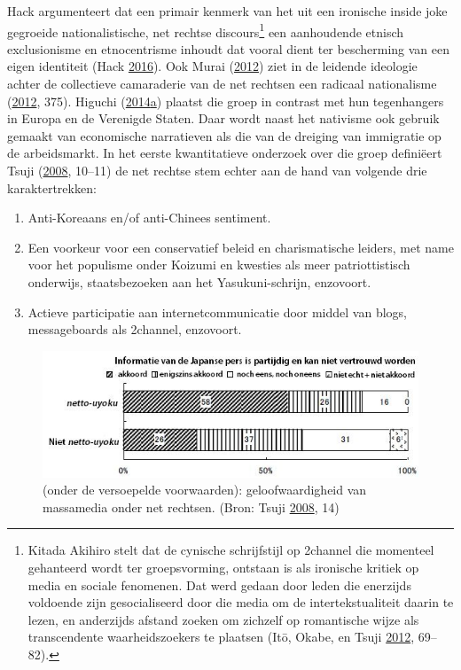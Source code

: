 \documentclass[10.5pt,dutch,]{article}
\providecommand{\tightlist}{%
  \setlength{\itemsep}{0pt}\setlength{\parskip}{0pt}}
\begin{document}
Hack argumenteert dat een primair kenmerk van het uit een ironische
inside joke gegroeide nationalistische, net rechtse discours\footnote{Kitada
  Akihiro stelt dat de cynische schrijfstijl op 2channel die momenteel
  gehanteerd wordt ter groepsvorming, ontstaan is als ironische kritiek
  op media en sociale fenomenen. Dat werd gedaan door leden die
  enerzijds voldoende zijn gesocialiseerd door die media om de
  intertekstualiteit daarin te lezen, en anderzijds afstand zoeken om
  zichzelf op romantische wijze als transcendente waarheidszoekers te
  plaatsen (Itō, Okabe, en Tsuji
  \protect\hyperlink{ref-itoux5ffandomux5f2012}{2012}, 69--82).} een
aanhoudende etnisch exclusionisme en etnocentrisme inhoudt dat vooral
dient ter bescherming van een eigen identiteit (Hack
\protect\hyperlink{ref-hackux5fsubcultureux5f2016}{2016}). Ook Murai
(\protect\hyperlink{ref-muraiux5fnetux5f2012}{2012}) ziet in de leidende
ideologie achter de collectieve camaraderie van de net rechtsen een
radicaal nationalisme
(\protect\hyperlink{ref-muraiux5fnetux5f2012}{2012}, 375). Higuchi
(\protect\hyperlink{ref-higuchiux5fjapansux5f2014}{2014}\protect\hyperlink{ref-higuchiux5fjapansux5f2014}{a})
plaatst die groep in contrast met hun tegenhangers in Europa en de
Verenigde Staten. Daar wordt naast het nativisme ook gebruik gemaakt van
economische narratieven als die van de dreiging van immigratie op de
arbeidsmarkt. In het eerste kwantitatieve onderzoek over die groep
definiëert Tsuji
(\protect\hyperlink{ref-tsujiux5fintanettoux5f2008}{2008}, 10--11) de
net rechtse stem echter aan de hand van volgende drie karaktertrekken:

\begin{enumerate}
\def\labelenumi{\arabic{enumi}.}
\tightlist
\item
  Anti-Koreaans en/of anti-Chinees sentiment.
\item
  Een voorkeur voor een conservatief beleid en charismatische leiders,
  met name voor het populisme onder Koizumi en kwesties als meer
  patriottistisch onderwijs, staatsbezoeken aan het Yasukuni-schrijn,
  enzovoort.
\item
  Actieve participatie aan internetcommunicatie door middel van blogs,
  messageboards als 2channel, enzovoort.
\end{enumerate}

\begin{figure}[htbp]
\centering
\includegraphics{images/tsuji_masukomi_translated.jpg}
\caption{(onder de versoepelde voorwaarden): geloofwaardigheid van
massamedia onder net rechtsen. (Bron: Tsuji
\protect\hyperlink{ref-tsujiux5fintanettoux5f2008}{2008}, 14)}
\end{figure}
\end{document}
